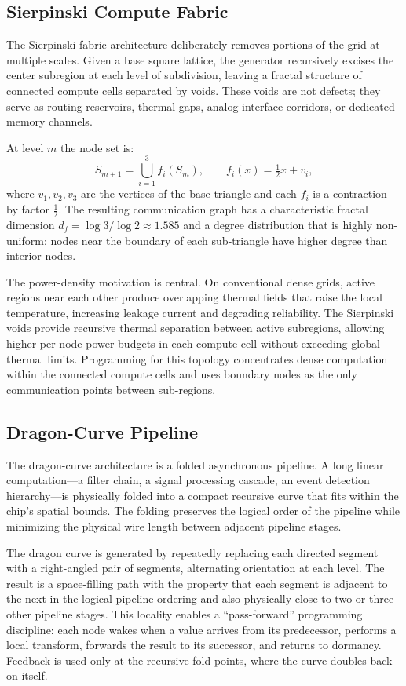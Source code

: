 \documentclass[11pt, a4paper]{article}
\begin{document}
\subsection{Sierpinski Compute Fabric}

The Sierpinski-fabric architecture deliberately removes portions of the grid at
multiple scales. Given a base square lattice, the generator recursively excises
the center subregion at each level of subdivision, leaving a fractal structure
of connected compute cells separated by voids. These voids are not defects; they
serve as routing reservoirs, thermal gaps, analog interface corridors, or dedicated
memory channels.

At level $m$ the node set is:
\[
S_{m+1} = \bigcup_{i=1}^{3} f_i(S_m), \qquad f_i(x) = \tfrac{1}{2}x + v_i,
\]
where $v_1, v_2, v_3$ are the vertices of the base triangle and each $f_i$ is a
contraction by factor $\tfrac{1}{2}$. The resulting communication graph has a
characteristic fractal dimension $d_f = \log 3 / \log 2 \approx 1.585$ and
a degree distribution that is highly non-uniform: nodes near the boundary of each
sub-triangle have higher degree than interior nodes.

The power-density motivation is central. On conventional dense grids, active
regions near each other produce overlapping thermal fields that raise the local
temperature, increasing leakage current and degrading reliability. The Sierpinski
voids provide recursive thermal separation between active subregions, allowing
higher per-node power budgets in each compute cell without exceeding global thermal
limits. Programming for this topology concentrates dense computation within the
connected compute cells and uses boundary nodes as the only communication points
between sub-regions.

\subsection{Dragon-Curve Pipeline}

The dragon-curve architecture is a folded asynchronous pipeline. A long linear
computation---a filter chain, a signal processing cascade, an event detection
hierarchy---is physically folded into a compact recursive curve that fits within
the chip's spatial bounds. The folding preserves the logical order of the pipeline
while minimizing the physical wire length between adjacent pipeline stages.

The dragon curve is generated by repeatedly replacing each directed segment with
a right-angled pair of segments, alternating orientation at each level. The result
is a space-filling path with the property that each segment is adjacent to the
next in the logical pipeline ordering and also physically close to two or three
other pipeline stages. This locality enables a ``pass-forward'' programming discipline:
each node wakes when a value arrives from its predecessor, performs a local transform,
forwards the result to its successor, and returns to dormancy. Feedback is used only
at the recursive fold points, where the curve doubles back on itself.
\end{document}
